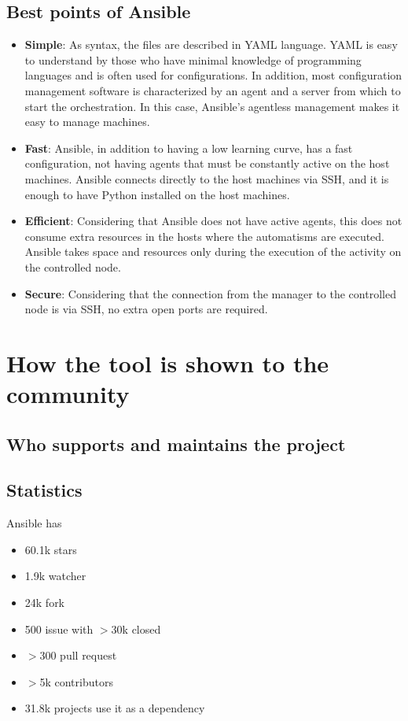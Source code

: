 \documentclass[12pt,a4paper,openright,twoside]{book}
\begin{document}
\subsection{Best points of Ansible}
\begin{itemize}
    \item \textbf{Simple}: As syntax, the files are described in YAML language. YAML is easy to understand by those who have minimal knowledge of programming languages and is often used for configurations. In addition, most configuration management software is characterized by an agent and a server from which to start the orchestration. In this case, Ansible's agentless management makes it easy to manage machines.
    \item \textbf{Fast}: Ansible, in addition to having a low learning curve, has a fast configuration, not having agents that must be constantly active on the host machines. Ansible connects directly to the host machines via SSH, and it is enough to have Python installed on the host machines.
    \item \textbf{Efficient}: Considering that Ansible does not have active agents, this does not consume extra resources in the hosts where the automatisms are executed. Ansible takes space and resources only during the execution of the activity on the controlled node.
    \item \textbf{Secure}: Considering that the connection from the manager to the controlled node is via SSH, no extra open ports are required.
\end{itemize}

\section{How the tool is shown to the community}

\subsection{Who supports and maintains the project}

\subsection{Statistics}
Ansible has 
\begin{itemize}
    \item 60.1k stars
    \item 1.9k watcher
    \item 24k fork
    \item 500 issue with $>$30k closed
    \item $>$300 pull request
    \item $>$5k contributors
    \item 31.8k projects use it as a dependency
\end{itemize}
\end{document}
